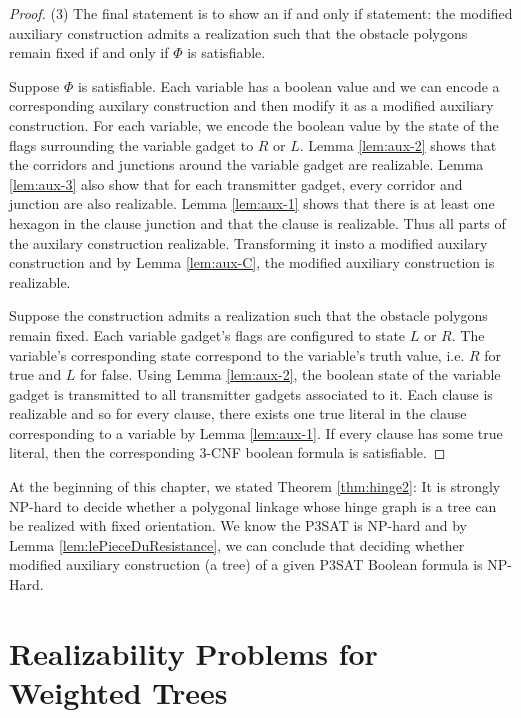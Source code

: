 \documentclass[10pt]{CSUNthesis}
\theoremstyle{plain}%
\theoremstyle{definition}
\theoremstyle{remark}
\begin{document}
\begin{proof}
\noindent (3) The final statement is to show an if and only if statement: the modified auxiliary construction admits a realization such that the obstacle polygons remain fixed if and only if $\Phi$ is satisfiable.

Suppose $\Phi$ is satisfiable.  %
Each variable has a boolean value and we can encode a corresponding auxilary construction and then modify it as a modified auxiliary construction.
For each variable, we encode the boolean value by the state of the flags surrounding the variable gadget to $R$ or $L$.  
Lemma \ref{lem:aux-2} shows that the corridors and junctions around the variable gadget are realizable.
Lemma \ref{lem:aux-3} also show that for each transmitter gadget, every corridor and junction are also realizable. 
Lemma \ref{lem:aux-1} shows that there is at least one hexagon in the clause junction and that the clause is realizable.
Thus all parts of the auxilary construction realizable.  
Transforming it insto a modified auxilary construction and by Lemma \ref{lem:aux-C}, the modified auxiliary construction is realizable.

Suppose the construction admits a realization such that the obstacle polygons remain fixed.
Each variable gadget's flags are configured to state $L$ or $R$. 
The variable's corresponding state correspond to the variable's truth value, i.e. $R$ for true and $L$ for false.
Using Lemma \ref{lem:aux-2}, the boolean state of the variable gadget is transmitted to all transmitter gadgets associated to it.
Each clause is realizable and so for every clause, there exists one true literal in the clause corresponding to a variable by Lemma \ref{lem:aux-1}. 
If every clause has some true literal, then the corresponding 3-CNF boolean formula is satisfiable.
\end{proof}

At the beginning of this chapter, we stated Theorem \ref{thm:hinge2}: It is strongly NP-hard to decide whether a polygonal linkage whose hinge graph is a tree can be realized with fixed orientation.  
We know the P3SAT is NP-hard \cite{lichtenstein1982planar} and by Lemma \ref{lem:lePieceDuResistance}, we can conclude that deciding whether modified auxiliary construction (a tree) of a given P3SAT Boolean formula is NP-Hard.

\chapter{Realizability Problems for Weighted Trees}\label{chp:disk}
\end{document}
